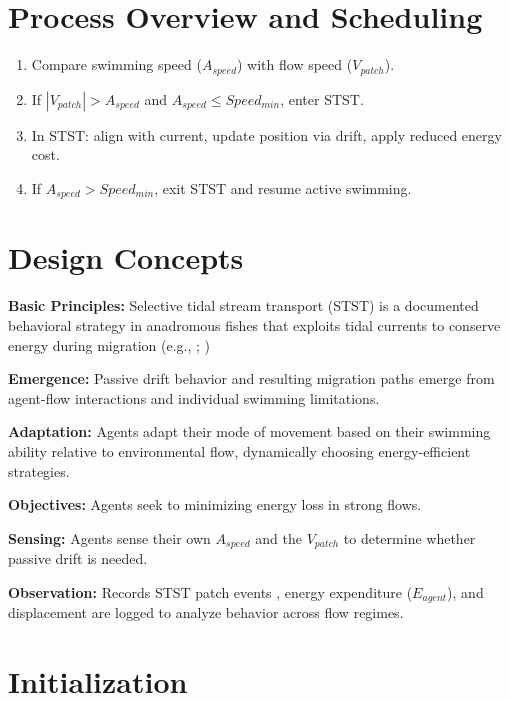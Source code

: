 \documentclass[
]{book}
\begin{document}
\section{Process Overview and Scheduling}\label{process-overview-and-scheduling-10}

\begin{enumerate}
\def\labelenumi{\arabic{enumi}.}
\item
  Compare swimming speed (\(A_{speed}\)) with flow speed (\(V_{patch}\)).
\item
  If \(|V_{patch}| > A_{speed}\) and \(A_{speed} \leq Speed_{min}\), enter
  STST.
\item
  In STST: align with current, update position via drift, apply
  reduced energy cost.
\item
  If \(A_{speed} > Speed_{min}\), exit STST and resume active swimming.
\end{enumerate}

\section{Design Concepts}\label{design-concepts-10}

\textbf{Basic Principles:} Selective tidal stream transport (STST) is a
documented behavioral strategy in anadromous fishes that exploits tidal
currents to conserve energy during migration (e.g.,
\citet{ForwardTankersley2001}; \citet{Gibson2001STST})

\textbf{Emergence:} Passive drift behavior and resulting migration paths
emerge from agent-flow interactions and individual swimming limitations.

\textbf{Adaptation:} Agents adapt their mode of movement based on their
swimming ability relative to environmental flow, dynamically choosing
energy-efficient strategies.

\textbf{Objectives:} Agents seek to minimizing energy loss in strong flows.

\textbf{Sensing:} Agents sense their own \(A_{speed}\) and the \(V_{patch}\) to
determine whether passive drift is needed.

\textbf{Observation:} Records STST patch events , energy expenditure
(\(E_{agent}\)), and displacement are logged to analyze behavior across
flow regimes.

\section{Initialization}\label{initialization-10}
\end{document}
